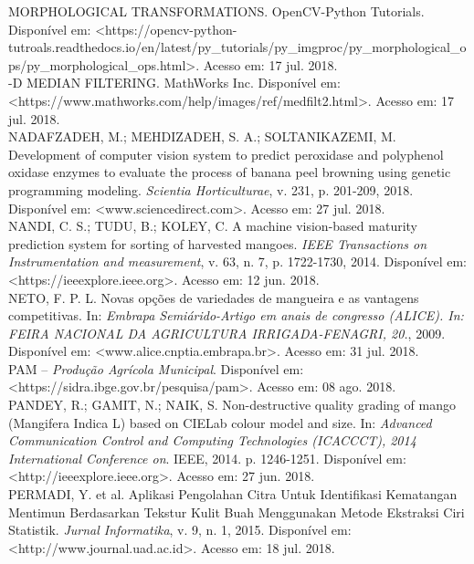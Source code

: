 \noindent MORPHOLOGICAL TRANSFORMATIONS. OpenCV-Python Tutorials. Disponível em: <https://opencv-python-tutroals.readthedocs.io/en/latest/py\_tutorials/py\_imgproc/py\_morphological\_ops/py\_morphological\_ops.html>. Acesso em: 17 jul. 2018.
\\

-D MEDIAN FILTERING. MathWorks Inc. Disponível em: <https://www.mathworks.com/help/images/ref/medfilt2.html>. Acesso em: 17 jul. 2018.
\\

\noindent NADAFZADEH, M.; MEHDIZADEH, S. A.; SOLTANIKAZEMI, M. Development of computer vision system to predict peroxidase and polyphenol oxidase enzymes to evaluate the process of banana peel browning using genetic programming modeling. \textit{Scientia Horticulturae}, v. 231, p. 201-209, 2018. Disponível em: <www.sciencedirect.com>. Acesso em: 27 jul. 2018.
\\

\noindent NANDI, C. S.; TUDU, B.; KOLEY, C. A machine vision-based maturity prediction system for sorting of harvested mangoes. \textit{IEEE Transactions on Instrumentation and measurement}, v. 63, n. 7, p. 1722-1730, 2014. Disponível em: <https://ieeexplore.ieee.org>. Acesso em: 12 jun. 2018.
\\

\noindent NETO, F. P. L. Novas opções de variedades de mangueira e as vantagens competitivas. In: \textit{Embrapa Semiárido-Artigo em anais de congresso (ALICE). In: FEIRA NACIONAL DA AGRICULTURA IRRIGADA-FENAGRI, 20.}, 2009. Disponível em: <www.alice.cnptia.embrapa.br>. Acesso em: 31 jul. 2018.
\\

\noindent PAM – \textit{Produção Agrícola Municipal}. Disponível em: <https://sidra.ibge.gov.br/pesquisa/pam>. Acesso em: 08 ago. 2018.
\\

\noindent PANDEY, R.; GAMIT, N.; NAIK, S. Non-destructive quality grading of mango (Mangifera Indica L) based on CIELab colour model and size. In: \textit{Advanced Communication Control and Computing Technologies (ICACCCT), 2014 International Conference on}. IEEE, 2014. p. 1246-1251. Disponível em: <http://ieeexplore.ieee.org>. Acesso em: 27 jun. 2018.
\\

\noindent PERMADI, Y. et al. Aplikasi Pengolahan Citra Untuk Identifikasi Kematangan Mentimun Berdasarkan Tekstur Kulit Buah Menggunakan Metode Ekstraksi Ciri Statistik. \textit{Jurnal Informatika}, v. 9, n. 1, 2015. Disponível em: <http://www.journal.uad.ac.id>. Acesso em: 18 jul. 2018.
\\

